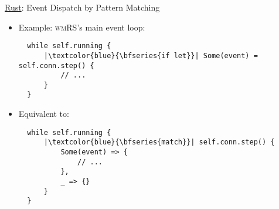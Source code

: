 \begin{frame}[fragile]{\underline{Rust}: Event Dispatch by Pattern Matching \hfill {\footnotesize \currentname}}


    \begin{itemize}

        \item Example: \textsc{wmRS}'s main event loop:\\
\begin{verbatim}
  while self.running {
      |\textcolor{blue}{\bfseries{if let}}| Some(event) = self.conn.step() {
          // ...
      }
  }
\end{verbatim}

        \item Equivalent to:\\
\begin{verbatim}
  while self.running {
      |\textcolor{blue}{\bfseries{match}}| self.conn.step() {
          Some(event) => {
              // ...
          },
          _ => {}
      }
  }
\end{verbatim}

    \end{itemize}

    \vfill

\end{frame}
